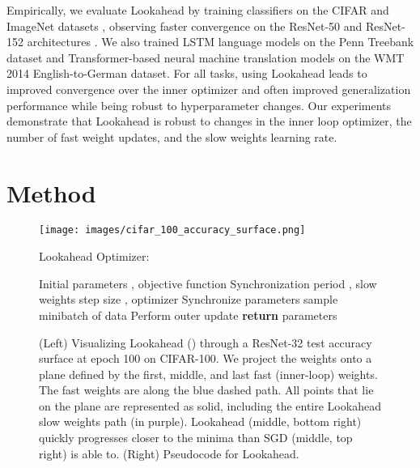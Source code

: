 \documentclass{article}
\begin{document}
Empirically, we evaluate Lookahead by  
training classifiers on the CIFAR \citep{krizhevsky2009learning} and ImageNet datasets \citep{deng2009imagenet}, observing faster convergence on the ResNet-50 and ResNet-152 architectures \citep{he2016deep}. We also trained LSTM language models on the Penn Treebank dataset \citep{marcus1993building} and Transformer-based \citep{vaswani2017attention} neural machine translation models on the WMT 2014 English-to-German dataset. For all tasks, using Lookahead leads to improved convergence over the inner optimizer and often improved generalization performance while being robust to hyperparameter changes. Our experiments demonstrate that Lookahead is robust to changes in the inner loop optimizer, the number of fast weight updates, and the slow weights learning rate. 













 \section{Method}
\label{sec:method}

\begin{figure}[t]
\centering
\vspace{-0.5cm}
\begin{minipage}{0.45\textwidth}
    \hspace{-0.3in}
    \texttt{[image: images/cifar\_100\_accuracy\_surface.png]}
        \vspace{-0.4cm}
\end{minipage}
\hfill
\hspace{-0.3in}
\begin{minipage}{0.55\textwidth}
\begin{algorithm}[H]
  \caption{Lookahead Optimizer:}
  \label{alg:lookahead}
\begin{algorithmic}
   \REQUIRE Initial parameters , objective function  
   \REQUIRE Synchronization period , slow weights step size , optimizer 
   \FOR{}
     \STATE Synchronize parameters 
     \FOR{}
        \STATE sample minibatch of data 
        \STATE 
     \ENDFOR
     \STATE Perform outer update 
   \ENDFOR 
   \STATE \textbf{return} parameters 
\end{algorithmic}
\end{algorithm}
\end{minipage}
\vspace{0.1in}

\caption{({{Left}}) Visualizing Lookahead () through a ResNet-32 test accuracy surface at epoch 100 on CIFAR-100. We project the weights onto a plane defined by the first, middle, and last fast (inner-loop) weights. The fast weights are along the blue dashed path. All points that lie on the plane are represented as solid, including the entire Lookahead slow weights path (in purple). Lookahead (middle, bottom right) quickly progresses closer to the minima than SGD (middle, top right) is able to. ({{Right}}) Pseudocode for Lookahead. \label{fig:cifar_100_loss_viz}}
\end{figure}
\end{document}
